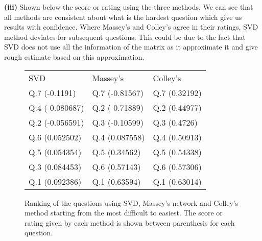 \textbf{(iii)} 
Shown below the score or rating using the three methods. We can see that all methods are consistent about what is the hardest question which give us results with confidence. Where Massey's and Colley's agree in their ratings, SVD method deviates for subsequent questions. This could be due to the fact that SVD does not use all the information of the matrix as it approximate it and give rough estimate based on this approximation. 
\begin{figure}[tbh]
 \centering    
\begin{tabular}{ |p{4cm}|| p{4cm}|p{4cm}|}
 \hline
 SVD & Massey's & Colley's \\ \hhline{|=|=|=|}
 \hline 
 Q.7 (-0.1191)   &   Q.7 (-0.81567) &  Q.7 (0.32192) \\      
 Q.4 (-0.080687) &   Q.2 (-0.71889) &  Q.2 (0.44977) \\
 Q.2 (-0.056591) &   Q.3 (-0.10599) &  Q.3 (0.4726)  \\
 Q.6 (0.052502)  &   Q.4 (0.087558) &  Q.4 (0.50913) \\
 Q.5 (0.054354)  &   Q.5 (0.34562)  &  Q.5 (0.54338) \\
 Q.3 (0.084453)  &   Q.6 (0.57143)  &  Q.6 (0.57306) \\
 Q.1 (0.092386)  &   Q.1 (0.63594)  &  Q.1 (0.63014) \\
 \hline
\end{tabular} 
\caption{Ranking of the questions using SVD, Massey's network and Colley's method starting from the most difficult to easiest. The score or rating given by each method is shown between parenthesis for each question.}
\end{figure}